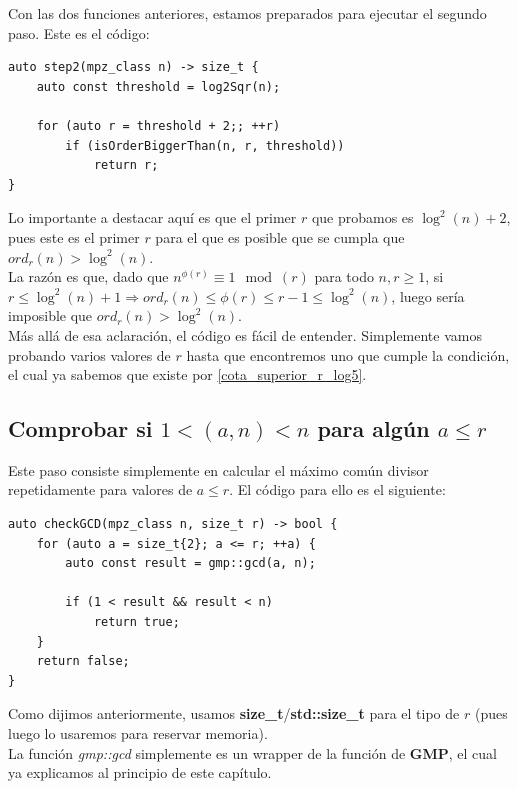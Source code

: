 Con las dos funciones anteriores, estamos preparados para ejecutar el segundo paso. Este es el código:\\

\begin{lstlisting}
auto step2(mpz_class n) -> size_t {
	auto const threshold = log2Sqr(n);
	
	for (auto r = threshold + 2;; ++r)
		if (isOrderBiggerThan(n, r, threshold))
			return r;
}
\end{lstlisting}

Lo importante a destacar aquí es que el primer $r$ que probamos es $\log^2(n) + 2$, pues este es el primer $r$ para el que es posible que se cumpla que $ord_r(n) > \log^2(n)$.\\

La razón es que, dado que $n^{\phi(r)} \equiv 1 \mod(r)$ para todo $n, r \geq 1$, si $r \leq \log^2(n) + 1 \Rightarrow ord_r(n) \leq \phi(r) \leq r - 1 \leq \log^2(n)$, luego sería imposible que $ord_r(n) > \log^2(n)$.\\

Más allá de esa aclaración, el código es fácil de entender. Simplemente vamos probando varios valores de $r$ hasta que encontremos uno que cumple la condición, el cual ya sabemos que existe por \autoref{cota_superior_r_log5}.

\subsection{Comprobar si $1 < (a, n) < n$ para algún $a \leq r$}

Este paso consiste simplemente en calcular el máximo común divisor repetidamente para valores de $a \leq r$. El código para ello es el siguiente:\\

\begin{lstlisting}
auto checkGCD(mpz_class n, size_t r) -> bool {
	for (auto a = size_t{2}; a <= r; ++a) {
		auto const result = gmp::gcd(a, n);
	
		if (1 < result && result < n)
			return true;
	}
	return false;
}
\end{lstlisting}

Como dijimos anteriormente, usamos \textbf{size\_t}/\textbf{std::size\_t} para el tipo de $r$ (pues luego lo usaremos para reservar memoria).\\

La función \textit{gmp::gcd} simplemente es un wrapper de la función de \textbf{GMP}, el cual ya explicamos al principio de este capítulo.\\

